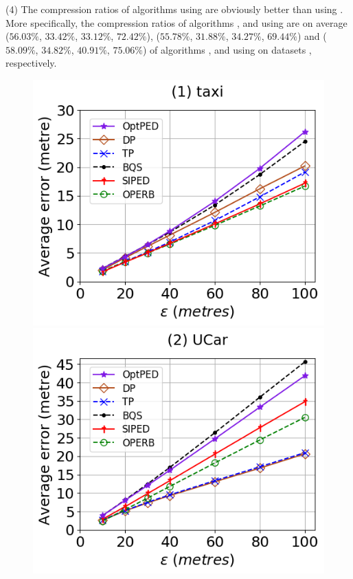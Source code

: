\sstab (4) The compression ratios of algorithms using \ped are obviously better
than using \sed.
More specifically, the compression ratios of algorithms \optp, \tpa and \dpa
using \ped are on average {($56.03\%$, $33.42\%$, $33.12\%$, $72.42\%$),
($55.78\%$, $31.88\%$, $34.27\%$, $69.44\%$) and ($58.09\%$, $34.82\%$,
$40.91\%$, $75.06\%$)} of algorithms \opt, \tpa and \dpa using \sed on datasets \dSets, respectively. 



\begin{figure}[tb!]
	\centering
	\includegraphics[scale=0.315]{Figures/Exp-PED-error-epsilon-taxi.png} \hspace{1ex}
	\includegraphics[scale=0.315]{Figures/Exp-PED-error-epsilon-service.png}	\hspace{1ex}

\end{figure}
